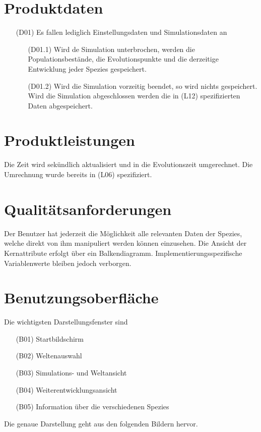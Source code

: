\documentclass[a4paper, 10pt]{article}
\begin{document}
\section{Produktdaten}
\begin{enumerate}
\item[(D01)]
Es fallen lediglich Einstellungsdaten und Simulationsdaten an
\begin{enumerate}
\item[(D01.1)]
Wird de Simulation unterbrochen, werden die Populationsbestände, die Evolutionspunkte und die derzeitige Entwicklung jeder Spezies gespeichert.
\item[(D01.2)]
Wird die Simulation vorzeitig beendet, so wird nichts gespeichert.
Wird die Simulation abgeschlossen werden die in (L12) spezifizierten Daten abgespeichert.
\end{enumerate}
\end{enumerate}

\section{Produktleistungen}
Die Zeit wird sekündlich aktualisiert und in die Evolutionszeit umgerechnet. Die Umrechnung wurde bereits in (L06) spezifiziert.

\section{Qualitätsanforderungen}
Der Benutzer hat jederzeit die Möglichkeit alle relevanten Daten der Spezies, welche direkt von ihm manipuliert werden können einzusehen. Die Ansicht der Kernattribute erfolgt über ein Balkendiagramm. Implementierungsspezifische Variablenwerte bleiben jedoch verborgen.

\section{Benutzungsoberfläche}
Die wichtigsten Darstellungsfenster sind
\begin{enumerate}
\item[(B01)] Startbildschirm
\item[(B02)] Weltenauswahl
\item[(B03)] Simulations- und Weltansicht
\item[(B04)] Weiterentwicklungsansicht
\item[(B05)] Information über die verschiedenen Spezies
\end{enumerate}
Die genaue Darstellung geht aus den folgenden Bildern hervor.
\end{document}
